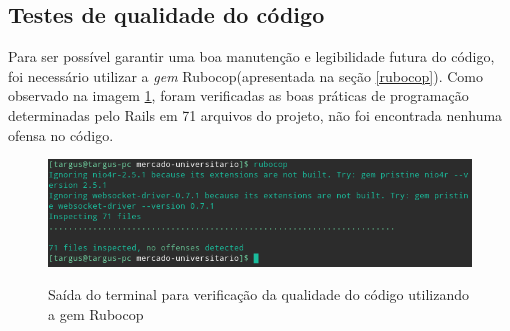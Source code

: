 \subsection{Testes de qualidade do código}
Para ser possível garantir uma boa manutenção e legibilidade futura do código, foi necessário utilizar a \textit{gem} Rubocop(apresentada na seção \ref{rubocop}). Como observado na imagem \ref{fig:rubocop}, foram verificadas as boas práticas de programação determinadas pelo Rails em 71 arquivos do projeto, não foi encontrada nenhuma ofensa no código.
\begin{figure}[htbp!]
  \centering
  \caption{Saída do terminal para verificação da qualidade do código utilizando a gem Rubocop}
  \includegraphics[width=1\textwidth]{figs/rubocop.png}
    \label{fig:rubocop}
\end{figure}
